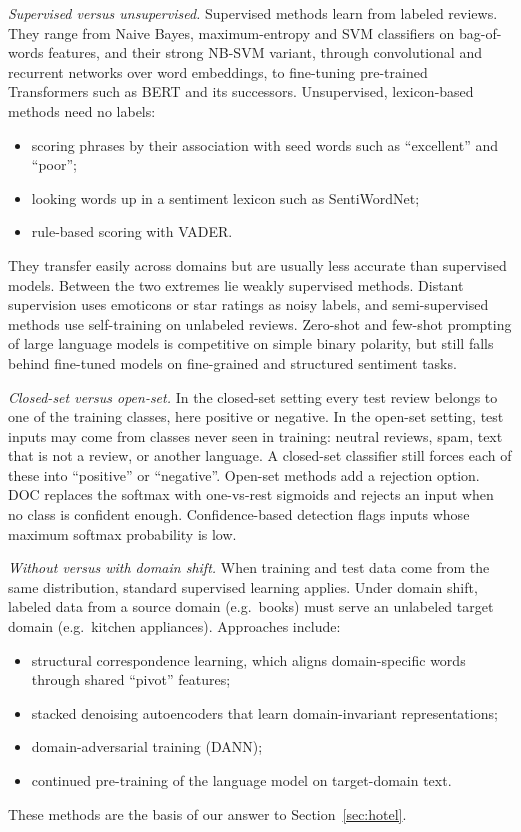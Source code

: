 \emph{Supervised versus unsupervised.}
Supervised methods learn from labeled reviews. They range from Naive Bayes, maximum-entropy and SVM classifiers on bag-of-words features, and their strong NB-SVM variant, through convolutional and recurrent networks over word embeddings, to fine-tuning pre-trained Transformers such as BERT\cite{devlin2019bert} and its successors.
Unsupervised, lexicon-based methods need no labels:
\begin{itemize}
  \item scoring phrases by their association with seed words such as ``excellent'' and ``poor'';
  \item looking words up in a sentiment lexicon such as SentiWordNet;
  \item rule-based scoring with VADER.
\end{itemize}
They transfer easily across domains but are usually less accurate than supervised models.
Between the two extremes lie weakly supervised methods. Distant supervision uses emoticons or star ratings as noisy labels, and semi-supervised methods use self-training on unlabeled reviews. Zero-shot and few-shot prompting of large language models is competitive on simple binary polarity, but still falls behind fine-tuned models on fine-grained and structured sentiment tasks\cite{zhang2023sentiment}.

\emph{Closed-set versus open-set.}
In the closed-set setting every test review belongs to one of the training classes, here positive or negative.
In the open-set setting, test inputs may come from classes never seen in training: neutral reviews, spam, text that is not a review, or another language.
A closed-set classifier still forces each of these into ``positive'' or ``negative''.
Open-set methods add a rejection option. DOC replaces the softmax with one-vs-rest sigmoids and rejects an input when no class is confident enough. Confidence-based detection flags inputs whose maximum softmax probability is low.

\emph{Without versus with domain shift.}
When training and test data come from the same distribution, standard supervised learning applies.
Under domain shift, labeled data from a source domain (e.g.\ books) must serve an unlabeled target domain (e.g.\ kitchen appliances). Approaches include:
\begin{itemize}
  \item structural correspondence learning, which aligns domain-specific words through shared ``pivot'' features\cite{blitzer2007biographies};
  \item stacked denoising autoencoders that learn domain-invariant representations;
  \item domain-adversarial training (DANN);
  \item continued pre-training of the language model on target-domain text.
\end{itemize}
These methods are the basis of our answer to Section~\ref{sec:hotel}.

